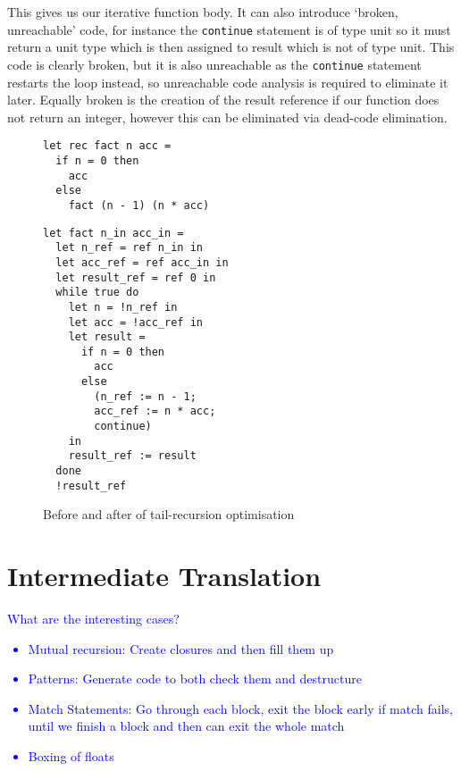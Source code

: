 \documentclass[12pt,twoside,notitlepage]{report}
\newcommand{\camlinline}{\texttt}
\newcommand\note[1]{\textcolor{blue}{#1}}
\begin{document}
This gives us our iterative function body. It can also introduce `broken, unreachable' code, for instance the \camlinline{continue} statement is of type unit so it must return a unit type which is then assigned to result which is not of type unit. This code is clearly broken, but it is also unreachable as the \camlinline{continue} statement restarts the loop instead, so unreachable code analysis is required to eliminate it later. Equally broken is the creation of the result reference if our function does not return an integer, however this can be eliminated via dead-code elimination.

\begin{figure}[h]
\begin{minipage}{0.5\linewidth}
	\begin{verbatim}
let rec fact n acc =
  if n = 0 then
    acc
  else
    fact (n - 1) (n * acc)
	\end{verbatim}
\end{minipage}
\begin{minipage}{0.5\linewidth}
\begin{verbatim}
let fact n_in acc_in =
  let n_ref = ref n_in in
  let acc_ref = ref acc_in in
  let result_ref = ref 0 in
  while true do
    let n = !n_ref in
    let acc = !acc_ref in
    let result =
      if n = 0 then
        acc
      else
        (n_ref := n - 1;
        acc_ref := n * acc;
        continue)
    in
    result_ref := result
  done
  !result_ref
\end{verbatim}
\end{minipage}
	\caption{Before and after of tail-recursion optimisation}
	\label{fig:tailrec}
\end{figure}

\section{Intermediate Translation}
\note{
	What are the interesting cases?
	\begin{itemize}
		\item Mutual recursion: Create closures and then fill them up
		\item Patterns: Generate code to both check them and destructure
		\item Match Statements: Go through each block, exit the block early if match fails, until we finish a block and then can exit the whole match
		\item Boxing of floats
	\end{itemize}
}
\end{document}
